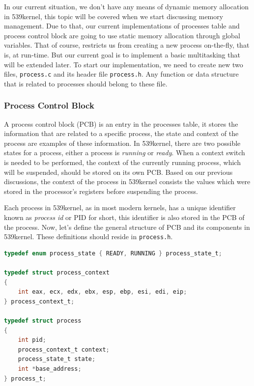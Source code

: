 In our current situation, we don't have any means of dynamic memory
allocation in 539kernel, this topic will be covered when we start
discussing memory management. Due to that, our current implementations
of processes table and process control block are going to use static
memory allocation through global variables. That of course, restricts us
from creating a new process on-the-fly, that is, at run-time. But our
current goal is to implement a basic multitasking that will be extended
later. To start our implementation, we need to create new two files,
\lstinline!process.c! and its header file \lstinline!process.h!. Any
function or data structure that is related to processes should belong to
these file.

\subsubsection{Process Control Block}\label{process-control-block}

A process control block (PCB) is an entry in the processes table, it
stores the information that are related to a specific process, the state
and context of the process are examples of these information. In
539kernel, there are two possible states for a process, either a process
is \emph{running} or \emph{ready}. When a context switch is needed to be
performed, the context of the currently running process, which will be
suspended, should be stored on its own PCB. Based on our previous
discussions, the context of the process in 539kernel consists the values
which were stored in the processor's registers before suspending the
process.

Each process in 539kernel, as in most modern kernels, has a unique
identifier known as \emph{process id} or PID for short, this identifier
is also stored in the PCB of the process. Now, let's define the general
structure of PCB and its components in 539kernel. These definitions
should reside in \lstinline!process.h!.

\begin{lstlisting}[language=C]
typedef enum process_state { READY, RUNNING } process_state_t;

typedef struct process_context
{
    int eax, ecx, edx, ebx, esp, ebp, esi, edi, eip;
} process_context_t;

typedef struct process
{
    int pid;
    process_context_t context;
    process_state_t state;
    int *base_address;
} process_t;
\end{lstlisting}

